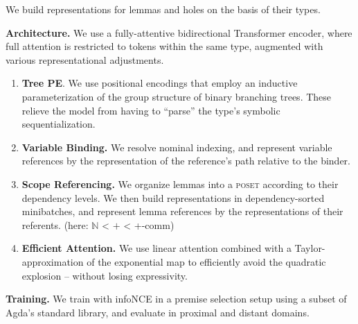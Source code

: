 \documentclass{article}
\newcommand{\sectionfont}{\fontsize{34}{34}\selectfont\setlength{\parskip}{1\baselineskip}}
\newcommand{\nfont}{\fontsize{21}{22}\selectfont\setlength{\parskip}{1\baselineskip}}
\newcommand{\light}[1]{\textcolor{gray!90}{#1}}
\begin{document}
	\begin{minipage}[t]{0.29\textwidth}
	\sectionfont{\textbf{Representation Learning}}
	\nfont

	We build representations for lemmas and holes on the basis of their types.
	
	\textbf{Architecture.} We use a fully-attentive bidirectional Transformer encoder, where full attention is restricted to tokens within the same type, augmented with various representational adjustments.
	\begin{enumerate}[topsep=-0.75\baselineskip]
		\item \textbf{Tree PE}. We use positional encodings that employ an inductive parameterization of the group structure of binary branching trees. These relieve the model from having to ``parse'' the type's symbolic sequentialization.
		\item \textbf{Variable Binding.} We resolve nominal indexing, and represent variable references by the representation of the reference's path relative to the binder.
		\item \textbf{Scope Referencing.} We organize lemmas into a \textsc{poset} according to their dependency levels. We then build representations in dependency-sorted minibatches, and represent lemma references by the representations of their referents.
		\light{\hfill (here: $\mathbb{N}$ < $+$ < +-comm)}
		\item \textbf{Efficient Attention.} We use linear attention combined with a Taylor-approximation of the exponential map to efficiently avoid the quadratic explosion -- without losing expressivity.
	\end{enumerate}
	
	\vspace{\baselineskip}
	\textbf{Training.} We train with infoNCE in a premise selection setup using a subset of Agda's standard library, and evaluate in proximal and distant domains.
	
	{\newcommand{\stdlib}{\texttt{stdlib}}
	\newcommand\unimath{\texttt{Unimath}}
	\newcommand\typetopo{\texttt{TypeTopo}}
	\newcommand\agdaQuill{\textsc{Quill}}	

	\newcommand{\sstat}[2]{\hphantom{1}\ensuremath{#1}}
	\newcommand{\bstat}[2]{\ensuremath{#1}}
	\newcommand{\bfstat}[2]{\ensuremath{\mathbf{#1}}}
	
	
}
\end{minipage}
\end{document}
